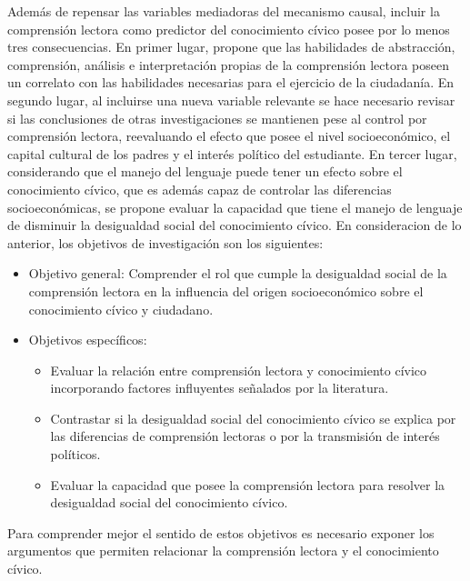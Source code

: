 \documentclass[
]{article}
\begin{document}
Además de repensar las variables mediadoras del mecanismo causal,
incluir la comprensión lectora como predictor del conocimiento cívico
posee por lo menos tres consecuencias. En primer lugar, propone que las
habilidades de abstracción, comprensión, análisis e interpretación
propias de la comprensión lectora poseen un correlato con las
habilidades necesarias para el ejercicio de la ciudadanía. En segundo
lugar, al incluirse una nueva variable relevante se hace necesario
revisar si las conclusiones de otras investigaciones se mantienen pese
al control por comprensión lectora, reevaluando el efecto que posee el
nivel socioeconómico, el capital cultural de los padres y el interés
político del estudiante. En tercer lugar, considerando que el manejo del
lenguaje puede tener un efecto sobre el conocimiento cívico, que es
además capaz de controlar las diferencias socioeconómicas, se propone
evaluar la capacidad que tiene el manejo de lenguaje de disminuir la
desigualdad social del conocimiento cívico. En consideracion de lo
anterior, los objetivos de investigación son los siguientes:

\begin{itemize}
\item
  Objetivo general: Comprender el rol que cumple la desigualdad social
  de la comprensión lectora en la influencia del origen socioeconómico
  sobre el conocimiento cívico y ciudadano.
\item
  Objetivos específicos:

  \begin{itemize}
  \item
    Evaluar la relación entre comprensión lectora y conocimiento cívico
    incorporando factores influyentes señalados por la literatura.
  \item
    Contrastar si la desigualdad social del conocimiento cívico se
    explica por las diferencias de comprensión lectoras o por la
    transmisión de interés políticos.
  \item
    Evaluar la capacidad que posee la comprensión lectora para resolver
    la desigualdad social del conocimiento cívico.
  \end{itemize}
\end{itemize}

Para comprender mejor el sentido de estos objetivos es necesario exponer
los argumentos que permiten relacionar la comprensión lectora y el
conocimiento cívico.
\end{document}
